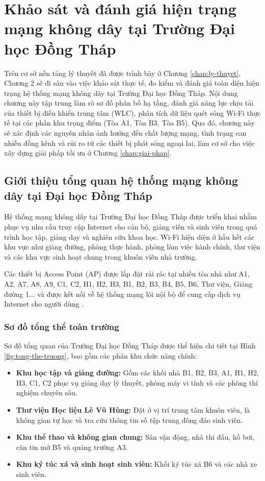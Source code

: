 \chapter{Khảo sát và đánh giá hiện trạng mạng không dây tại Trường Đại học Đồng Tháp}
\label{chap:hien-trang}

Trên cơ sở nền tảng lý thuyết đã được trình bày ở Chương \ref{chap:ly-thuyet}, Chương 2 sẽ đi sâu vào việc khảo sát thực tế, đo kiểm và đánh giá toàn diện hiện trạng hệ thống mạng không dây tại Trường Đại học Đồng Tháp. Nội dung chương này tập trung làm rõ sơ đồ phân bố hạ tầng, đánh giá năng lực chịu tải của thiết bị điều khiển trung tâm (WLC), phân tích dữ liệu quét sóng Wi-Fi thực tế tại các phân khu trọng điểm (Tòa A1, Tòa B3, Tòa B5). Qua đó, chương này sẽ xác định các nguyên nhân ảnh hưởng đến chất lượng mạng, tình trạng can nhiễu đồng kênh và rủi ro từ các thiết bị phát sóng ngoại lai, làm cơ sở cho việc xây dựng giải pháp tối ưu ở Chương \ref{chap:giai-phap}.

\section{Giới thiệu tổng quan hệ thống mạng không dây tại Đại học Đồng Tháp}

Hệ thống mạng không dây tại Trường Đại học Đồng Tháp được triển khai nhằm phục vụ nhu cầu truy cập Internet cho cán bộ, giảng viên và sinh viên trong quá trình học tập, giảng dạy và nghiên cứu khoa học. Wi-Fi hiện diện ở hầu hết các khu vực như giảng đường, phòng thực hành, phòng làm việc hành chính, thư viện và các khu vực sinh hoạt chung trong khuôn viên nhà trường.

Các thiết bị Access Point (AP) được lắp đặt rải rác tại nhiều tòa nhà như A1, A2, A7, A8, A9, C1, C2, H1, H2, H3, B1, B2, B3, B4, B5, B6, Thư viện, Giảng đường 1... và được kết nối về hệ thống mạng lõi nội bộ để cung cấp dịch vụ Internet cho người dùng \cite{dthu2026hientrang}.

\subsection{Sơ đồ tổng thể toàn trường}

Sơ đồ tổng quan của Trường Đại học Đồng Tháp được thể hiện chi tiết tại Hình \ref{fig:tong-the-truong}, bao gồm các phân khu chức năng chính:
\begin{itemize}
    \item \textbf{Khu học tập và giảng đường:} Gồm các khối nhà B1, B2, B3, A1, H1, H2, H3, C1, C2 phục vụ giảng dạy lý thuyết, phòng máy vi tính và các phòng thí nghiệm chuyên sâu.
    \item \textbf{Thư viện Học liệu Lê Vũ Hùng:} Đặt ở vị trí trung tâm khuôn viên, là không gian tự học và tra cứu thông tin số tập trung đông đảo sinh viên.
    \item \textbf{Khu thể thao và không gian chung:} Sân vận động, nhà thi đấu, hồ bơi, căn tin mở B5 và quảng trường A3.
    \item \textbf{Khu ký túc xá và sinh hoạt sinh viên:} Khối ký túc xá B6 và các nhà xe sinh viên.
\end{itemize}

